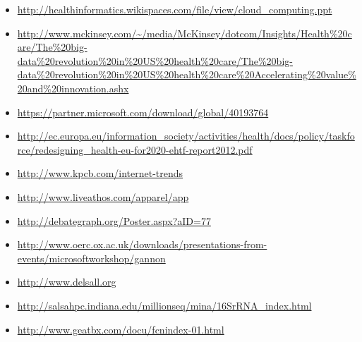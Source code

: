 \begin{itemize}
\item
  \url{http://healthinformatics.wikispaces.com/file/view/cloud_computing.ppt}
\item
  \url{http://www.mckinsey.com/~/media/McKinsey/dotcom/Insights/Health\%20care/The\%20big-data\%20revolution\%20in\%20US\%20health\%20care/The\%20big-data\%20revolution\%20in\%20US\%20health\%20care\%20Accelerating\%20value\%20and\%20innovation.ashx}
\item
  \url{https://partner.microsoft.com/download/global/40193764}
\item
  \url{http://ec.europa.eu/information_society/activities/health/docs/policy/taskforce/redesigning_health-eu-for2020-ehtf-report2012.pdf}
\item
  \url{http://www.kpcb.com/internet-trends}
\item
  \url{http://www.liveathos.com/apparel/app}
\item
  \url{http://debategraph.org/Poster.aspx?aID=77}
\item
  \url{http://www.oerc.ox.ac.uk/downloads/presentations-from-events/microsoftworkshop/gannon}
\item
  \url{http://www.delsall.org}
\item
  \url{http://salsahpc.indiana.edu/millionseq/mina/16SrRNA_index.html}
\item
  \url{http://www.geatbx.com/docu/fcnindex-01.html}
\end{itemize}
